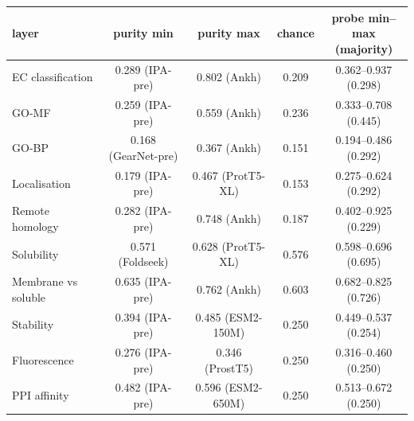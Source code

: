 \begin{table}[!htbp]
\par\medskip
\begin{adjustbox}{max width=\linewidth}
\begin{tabular}{lcccc}
\toprule
\rowcolor{CompassLavender!32}
layer & purity min & purity max & chance & \makecell{probe min--max\\(majority)} \\
\midrule
EC classification & 0.289 (IPA-pre) & 0.802 (Ankh) & 0.209 & 0.362--0.937 (0.298) \\
GO-MF & 0.259 (IPA-pre) & 0.559 (Ankh) & 0.236 & 0.333--0.708 (0.445) \\
GO-BP & 0.168 (GearNet-pre) & 0.367 (Ankh) & 0.151 & 0.194--0.486 (0.292) \\
Localisation & 0.179 (IPA-pre) & 0.467 (ProtT5-XL) & 0.153 & 0.275--0.624 (0.292) \\
Remote homology & 0.282 (IPA-pre) & 0.748 (Ankh) & 0.187 & 0.402--0.925 (0.229) \\
Solubility & 0.571 (Foldseek) & 0.628 (ProtT5-XL) & 0.576 & 0.598--0.696 (0.695) \\
Membrane vs soluble & 0.635 (IPA-pre) & 0.762 (Ankh) & 0.603 & 0.682--0.825 (0.726) \\
Stability & 0.394 (IPA-pre) & 0.485 (ESM2-150M) & 0.250 & 0.449--0.537 (0.254) \\
Fluorescence & 0.276 (IPA-pre) & 0.346 (ProstT5) & 0.250 & 0.316--0.460 (0.250) \\
PPI affinity & 0.482 (IPA-pre) & 0.596 (ESM2-650M) & 0.250 & 0.513--0.672 (0.250) \\
\bottomrule
\end{tabular}
\end{adjustbox}
\end{table}
